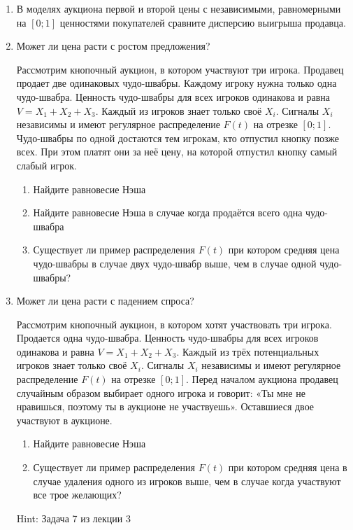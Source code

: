 \begin{enumerate}
\item В моделях аукциона первой и второй цены с независимыми, равномерными на $ [0;1] $ ценностями покупателей сравните дисперсию выигрыша продавца.


\item Может ли цена расти с ростом предложения?

Рассмотрим кнопочный аукцион, в котором участвуют три игрока. Продавец продает две одинаковых чудо-швабры. Каждому игроку нужна только одна чудо-швабра. Ценность чудо-швабры для всех игроков одинакова и равна $ V=X_{1}+X_{2}+X_{3} $. Каждый из игроков знает только своё $ X_{i} $. Сигналы $ X_{i} $ независимы и имеют регулярное распределение $ F(t) $ на отрезке $ [0;1] $. Чудо-швабры по одной достаются тем игрокам, кто отпустил кнопку позже всех. При этом платят они за неё цену, на которой отпустил кнопку самый слабый игрок.

\begin{enumerate}
\item Найдите равновесие Нэша
\item Найдите равновесие Нэша в случае когда продаётся всего одна чудо-швабра
\item Существует ли пример распределения $ F(t) $ при котором средняя цена чудо-швабры в  случае двух чудо-швабр выше, чем в случае одной чудо-швабры?
\end{enumerate}



\item Может ли цена расти с падением спроса?

Рассмотрим кнопочный аукцион, в котором хотят участвовать три игрока. Продается одна чудо-швабра. Ценность чудо-швабры для всех игроков одинакова и равна $ V=X_{1}+X_{2}+X_{3} $. Каждый из трёх потенциальных игроков знает только своё $ X_{i} $. Сигналы $ X_{i} $ независимы и имеют регулярное распределение $ F(t) $ на отрезке $ [0;1] $. Перед началом аукциона продавец случайным образом выбирает одного игрока и говорит: «Ты мне не нравишься, поэтому ты в аукционе не участвуешь». Оставшиеся двое участвуют в аукционе.

\begin{enumerate}
\item Найдите равновесие Нэша
\item Существует ли пример распределения $ F(t) $ при котором средняя цена в случае удаления одного из игроков выше, чем в случае когда участвуют все трое желающих?
\end{enumerate}

Hint: Задача 7 из лекции 3




\end{enumerate}
